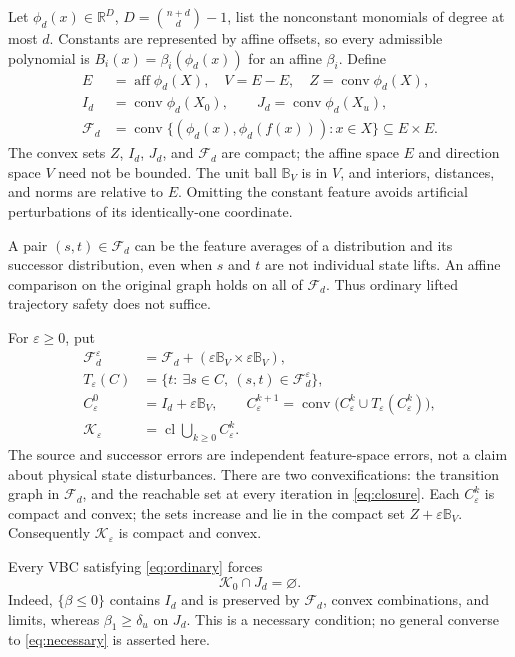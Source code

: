 \documentclass[10pt,letterpaper]{article}
\theoremstyle{remark}
\newcommand{\R}{\mathbb R}
\newcommand{\co}{\operatorname{conv}}
\newcommand{\cl}{\operatorname{cl}}
\newcommand{\ball}{\mathbb B_V}
\newcommand{\F}{\mathcal F_d}
\begin{document}
Let $\phi_d(x)\in\R^D$, $D=\binom{n+d}{d}-1$, list the nonconstant monomials of degree at most $d$. Constants are represented by affine offsets, so every admissible polynomial is $B_i(x)=\beta_i(\phi_d(x))$ for an affine $\beta_i$. Define
\begin{align}
 E&=\operatorname{aff}\phi_d(X),\quad V=E-E,\quad
 Z=\co\phi_d(X),\nonumber\\
 I_d&=\co\phi_d(X_0),\qquad J_d=\co\phi_d(X_u),\label{eq:features}\\
 \F&=\co\{(\phi_d(x),\phi_d(f(x))):x\in X\}\subseteq E\times E.\nonumber
\end{align}
The convex sets $Z$, $I_d$, $J_d$, and $\F$ are compact; the affine space $E$ and direction space $V$ need not be bounded. The unit ball $\ball$ is in $V$, and interiors, distances, and norms are relative to $E$. Omitting the constant feature avoids artificial perturbations of its identically-one coordinate.

A pair $(s,t)\in\F$ can be the feature averages of a distribution and its successor distribution, even when $s$ and $t$ are not individual state lifts. An affine comparison on the original graph holds on all of $\F$. Thus ordinary lifted trajectory safety does not suffice.

For $\varepsilon\geq0$, put
\begin{align}
 \mathcal F_d^\varepsilon&=\F+(\varepsilon\ball\times\varepsilon\ball),\nonumber\\
 T_\varepsilon(C)&=\{t:\ \exists s\in C,\ (s,t)\in\mathcal F_d^\varepsilon\},\nonumber\\
 C_\varepsilon^0&=I_d+\varepsilon\ball,\qquad
 C_\varepsilon^{k+1}=\co\bigl(C_\varepsilon^k\cup T_\varepsilon(C_\varepsilon^k)\bigr),\label{eq:closure}\\
 \mathcal K_\varepsilon&=\cl\bigcup_{k\geq0}C_\varepsilon^k.\nonumber
\end{align}
The source and successor errors are independent feature-space errors, not a claim about physical state disturbances. There are two convexifications: the transition graph in $\F$, and the reachable set at every iteration in \eqref{eq:closure}. Each $C_\varepsilon^k$ is compact and convex; the sets increase and lie in the compact set $Z+\varepsilon\ball$. Consequently $\mathcal K_\varepsilon$ is compact and convex.

Every VBC satisfying \eqref{eq:ordinary} forces
\begin{equation}\label{eq:necessary}
 \mathcal K_0\cap J_d=\varnothing.
\end{equation}
Indeed, $\{\beta\leq0\}$ contains $I_d$ and is preserved by $\F$, convex combinations, and limits, whereas $\beta_1\geq\delta_u$ on $J_d$. This is a necessary condition; no general converse to \eqref{eq:necessary} is asserted here.
\end{document}
